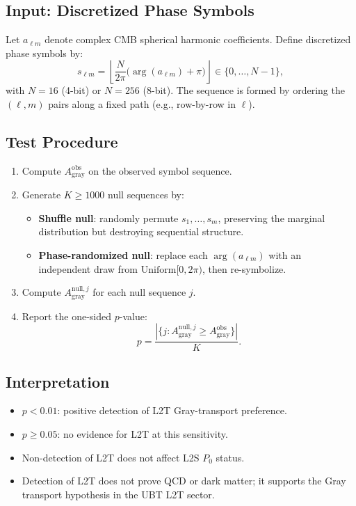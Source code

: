 \documentclass[11pt]{article}
\begin{document}
\subsection{Input: Discretized Phase Symbols}

Let $a_{\ell m}$ denote complex CMB spherical harmonic coefficients. Define
discretized phase symbols by:
\[
  s_{\ell m} = \left\lfloor \frac{N}{2\pi}\bigl(\arg(a_{\ell m}) + \pi\bigr)
  \right\rfloor \in \{0,\dots,N{-}1\},
\]
with $N = 16$ (4-bit) or $N = 256$ (8-bit). The sequence is formed by
ordering the $(\ell, m)$ pairs along a fixed path (e.g., row-by-row in $\ell$).

\subsection{Test Procedure}

\begin{enumerate}
\item Compute $A_{\mathrm{gray}}^{\mathrm{obs}}$ on the observed symbol sequence.
\item Generate $K \geq 1000$ null sequences by:
  \begin{itemize}
  \item \textbf{Shuffle null}: randomly permute $s_1,\dots,s_m$, preserving the
  marginal distribution but destroying sequential structure.
  \item \textbf{Phase-randomized null}: replace each $\arg(a_{\ell m})$ with an
  independent draw from $\mathrm{Uniform}[0, 2\pi)$, then re-symbolize.
  \end{itemize}
\item Compute $A_{\mathrm{gray}}^{\mathrm{null},j}$ for each null sequence $j$.
\item Report the one-sided $p$-value:
\[
  p = \frac{|\{j : A_{\mathrm{gray}}^{\mathrm{null},j} \geq A_{\mathrm{gray}}^{\mathrm{obs}}\}|}{K}.
\]
\end{enumerate}

\subsection{Interpretation}

\begin{itemize}
\item $p < 0.01$: positive detection of L2T Gray-transport preference.
\item $p \geq 0.05$: no evidence for L2T at this sensitivity.
\item Non-detection of L2T does not affect L2S $P_0$ status.
\item Detection of L2T does not prove QCD or dark matter; it supports the
Gray transport hypothesis in the UBT L2T sector.
\end{itemize}
\end{document}
